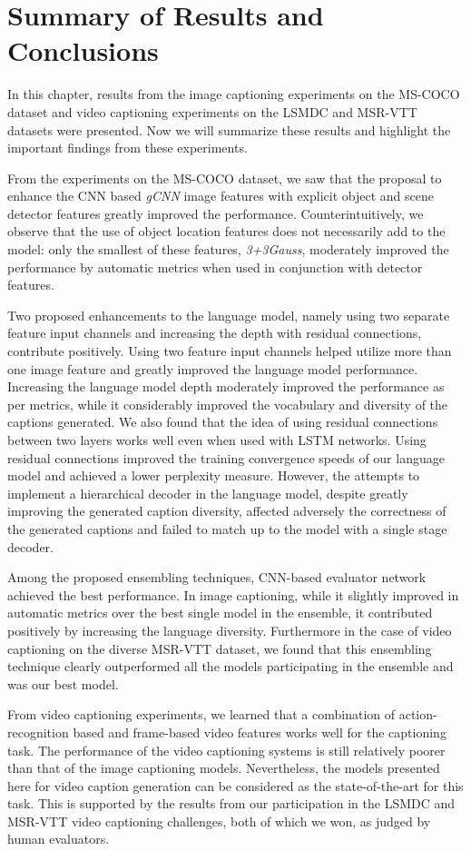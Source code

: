 \section{Summary of Results and Conclusions}
In this chapter, results from the image captioning experiments on the MS-COCO
dataset and video captioning experiments on the LSMDC and MSR-VTT datasets were
presented.
Now we will summarize these results and highlight the important findings from
these experiments.

From the experiments on the MS-COCO dataset, we saw that the proposal to enhance
the CNN based \emph{gCNN} image features with explicit object and scene detector
features greatly improved the performance. 
Counterintuitively, we observe that the use of object location features does
not necessarily add to the model: only the smallest of these features,
\emph{3+3Gauss}, moderately improved the performance by automatic metrics when
used in conjunction with detector features.

Two proposed enhancements to the language model, namely using two separate
feature input channels and increasing the depth with residual connections,
contribute positively.
Using two feature input channels helped utilize more than one image feature and
greatly improved the language model performance.
Increasing the language model depth moderately improved the performance as per
metrics, while it considerably improved the vocabulary and diversity of the
captions generated.
We also found that the idea of using residual connections between two layers
works well even when used with LSTM networks.
Using residual connections improved the training convergence speeds of our
language model and achieved a lower perplexity measure.
However, the attempts to implement a hierarchical decoder in the language model,
despite greatly improving the generated caption diversity, affected adversely 
the correctness of the generated captions and failed to match up to the model
with a single stage decoder.

Among the proposed ensembling techniques, CNN-based evaluator network achieved
the best performance.
In image captioning, while it slightly improved in automatic metrics over the
best single model in the ensemble, it contributed positively by increasing the
language diversity. 
Furthermore in the case of video captioning on the diverse MSR-VTT dataset, we
found that this ensembling technique clearly outperformed all the models
participating in the ensemble and was our best model.

From video captioning experiments, we learned that a combination of action-
recognition based and frame-based video features works well for the captioning
task.
The performance of the video captioning systems is still relatively poorer than
that of the image captioning models.
Nevertheless, the models presented here for video caption generation can be
considered as the state-of-the-art for this task.
This is supported by the results from our participation in the LSMDC and MSR-VTT
video captioning challenges, both of which we won, as judged by human
evaluators.

